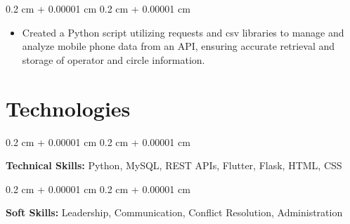 \documentclass[12pt, letterpaper]{article}
\newenvironment{highlights}{
    \begin{itemize}[
        topsep=0.10 cm,
        parsep=0.10 cm,
        partopsep=0pt,
        itemsep=0pt,
        leftmargin=0.4 cm + 10pt
    ]
}{
    \end{itemize}
} %
\newenvironment{onecolentry}{
    \begin{adjustwidth}{
        0.2 cm + 0.00001 cm
    }{
        0.2 cm + 0.00001 cm
    }
}{
    \end{adjustwidth}
} %
\begin{document}
        \vspace{0.10 cm}
        \begin{onecolentry}
            \begin{highlights}
                \item Created a Python script utilizing requests and csv libraries to manage and analyze mobile phone data from an API, ensuring accurate retrieval and storage of operator and circle information.
            \end{highlights}
        \end{onecolentry}



    
    \section{Technologies}



        
        \begin{onecolentry}
            \textbf{Technical Skills:} Python, MySQL, REST APIs, Flutter, Flask, HTML, CSS
        \end{onecolentry}

        \vspace{0.2 cm}

        \begin{onecolentry}
            \textbf{Soft Skills:} Leadership, Communication, Conflict Resolution, Administration
        \end{onecolentry}


    
\end{document}
